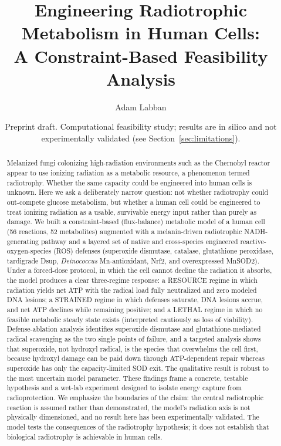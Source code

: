 \documentclass[11pt]{article}
\title{\bfseries Engineering Radiotrophic Metabolism in Human Cells:\\
A Constraint-Based Feasibility Analysis}
\author{Adam Labban}
\date{Preprint draft. Computational feasibility study; results are in silico
and not experimentally validated (see Section~\ref{sec:limitations}).}
\begin{document}
\maketitle

\begin{abstract}
\noindent
Melanized fungi colonizing high-radiation environments such as the Chernobyl
reactor appear to use ionizing radiation as a metabolic resource, a phenomenon
termed radiotrophy. Whether the same capacity could be engineered into human
cells is unknown. Here we ask a deliberately narrow question: not whether
radiotrophy could out-compete glucose metabolism, but whether a human cell could
be engineered to treat ionizing radiation as a usable, survivable energy input
rather than purely as damage. We built a constraint-based (flux-balance)
metabolic model of a human cell (56 reactions, 52 metabolites) augmented with a
melanin-driven radiotrophic NADH-generating pathway and a layered set of native
and cross-species engineered reactive-oxygen-species (ROS) defenses (superoxide
dismutase, catalase, glutathione peroxidase, tardigrade Dsup, \textit{Deinococcus}
Mn-antioxidant, Nrf2, and overexpressed MnSOD2). Under a forced-dose protocol, in
which the cell cannot decline the radiation it absorbs, the model produces a clear
three-regime response: a RESOURCE regime in which radiation yields net ATP with
the radical load fully neutralized and zero modeled DNA lesions; a STRAINED regime
in which defenses saturate, DNA lesions accrue, and net ATP declines while remaining
positive; and a LETHAL regime in which no feasible metabolic steady state exists
(interpreted cautiously as loss of viability). Defense-ablation analysis identifies
superoxide dismutase and
glutathione-mediated radical scavenging as the two single points of failure, and
a targeted analysis shows that superoxide, not hydroxyl radical, is the species
that overwhelms the cell first, because hydroxyl damage can be paid down through
ATP-dependent repair whereas superoxide has only the capacity-limited SOD exit.
The qualitative result is robust to the most uncertain model parameter. These
findings frame a concrete, testable hypothesis and a wet-lab experiment designed to
isolate energy capture from radioprotection. We emphasize the boundaries of the
claim: the central radiotrophic reaction is assumed rather than demonstrated, the
model's radiation axis is not physically dimensioned, and no result here has been
experimentally validated. The model tests the consequences of the radiotrophy
hypothesis; it does not establish that biological radiotrophy is achievable in
human cells.
\end{abstract}
\end{document}

